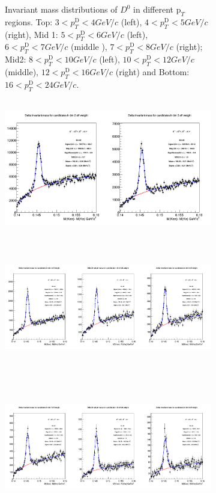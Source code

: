 \begin{enumerate}
\begin{figure}
\begin{enumerate}
\begin{figure}[!htp]
\caption{Invariant mass distributions of $D^0$ in different $\text{p}_T$ regions. Top: $3< p_{T}^{\text{D}}< 4 GeV/c$ (left), $4< p_{T}^{\text{D}}< 5 GeV/c$ (right), Mid 1: $5< p_{T}^{\text{D}}< 6 GeV/c$ (left), $6 < p_{T}^{\text{D}} < 7 GeV/c$ (middle ), $7< p_{T}^{\text{D}}< 8 GeV/c$ (right); Mid2: $8< p_{T}^{\text{D}}< 10GeV/c$ (left), $10< p_{T}^{\text{D}}< 12 GeV/c$ (middle), $12 < p_{T}^{\text{D}}< 16 GeV/c$ (right) and Bottom: $16<p_{T}^{\text{D}}< 24 GeV/c$.}
\label{fig:InvMass}
\end{figure}

\begin{figure}[!htp]
\centering
{\includegraphics[width=1\linewidth, height=6cm]{figures/Dstar_wEFF/InvMassDistributions_Dstar_Bins2to3.png}}
{\includegraphics[width=1\linewidth, height=6cm]{figures/Dstar_wEFF/InvMassDistributions_Dstar_Bins4to6.png}}
{\includegraphics[width=1\linewidth, height=6cm]{figures/Dstar_wEFF/InvMassDistributions_Dstar_Bins7to9.png}}

\end{figure}
\end{enumerate}
\end{figure}
\end{enumerate}
